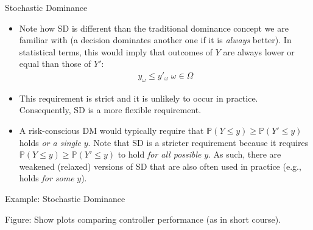 \documentclass[9pt]{beamer}
\begin{document}
%
\begin{frame}{Stochastic Dominance}

\begin{itemize}

\item Note how SD is different than the traditional dominance concept we are familiar with (a decision dominates another one if it is {\em always} better). In statistical terms, this would imply that outcomes of $Y$ are always lower or equal than those of $Y'$:
\begin{align*}
y_{\omega}\leq y'_\omega\; \omega \in \Omega
\end{align*}
\item This requirement is strict and it is unlikely to occur in practice. Consequently, SD is a more flexible requirement. 
\item A risk-conscious DM would typically require that $\mathbb{P}(Y\leq y)\geq \mathbb{P}(Y'\leq y)$ holds {\em or a single} $y$. Note that SD is a stricter requirement because it requires $\mathbb{P}(Y\leq y)\geq \mathbb{P}(Y'\leq y)$ to hold {\em for all possible} $y$. As such, there are weakened (relaxed) versions of SD that are also often used in practice (e.g., holds {\em for some} $y$).  
\end{itemize}


\end{frame}

%
\begin{frame}{Example: Stochastic Dominance}

\begin{block}{}
Figure: Show plots comparing controller performance (as in short course). 
\end{block}

\end{frame}
\end{document}

